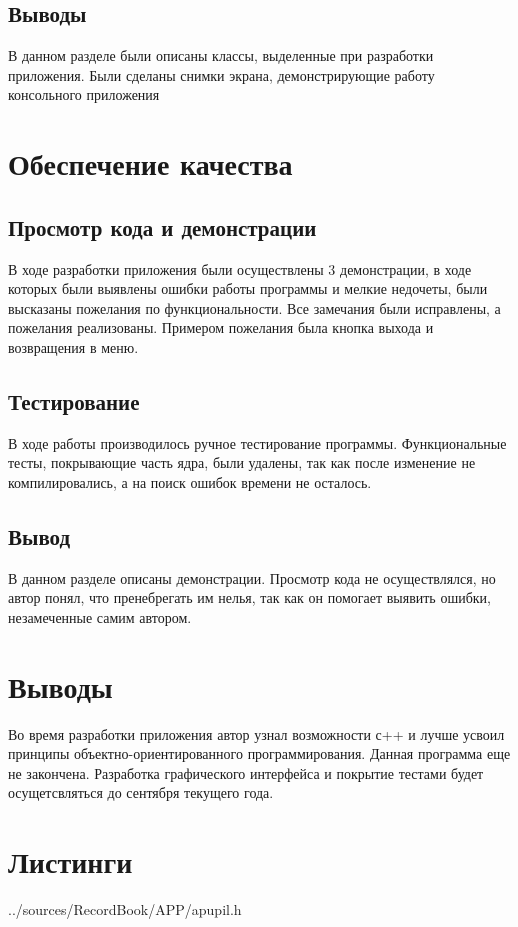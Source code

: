 \documentclass[12pt,a4paper]{report}
\begin{document}
\section{Выводы}

В данном разделе были описаны классы, выделенные при разработки приложения. Были сделаны снимки экрана, демонстрирующие работу консольного приложения

\chapter{Обеспечение качества}
\section{Просмотр кода и демонстрации}
В ходе разработки приложения были осуществлены 3 демонстрации, в ходе которых были выявлены ошибки работы программы и мелкие недочеты, были высказаны пожелания по функциональности. Все замечания были исправлены, а пожелания реализованы.
Примером пожелания была кнопка выхода и возвращения в меню.
\section{Тестирование}
В ходе работы производилось ручное тестирование программы. Функциональные тесты, покрывающие часть ядра, были удалены, так как после изменение не компилировались, а на поиск ошибок времени не осталось.

\section{Вывод}
В данном разделе описаны демонстрации. Просмотр кода не осуществлялся, но автор понял, что пренебрегать им нелья, так как он помогает выявить ошибки, незамеченные самим автором.

\chapter{Выводы}
Во время разработки приложения автор узнал возможности с++ и лучше усвоил принципы объектно-ориентированного программирования.
Данная программа еще не закончена. Разработка графического интерфейса и покрытие тестами будет осущетсвляться до сентября текущего года.

\chapter*{Листинги}

{../sources/RecordBook/APP/apupil.h}
\end{document}
